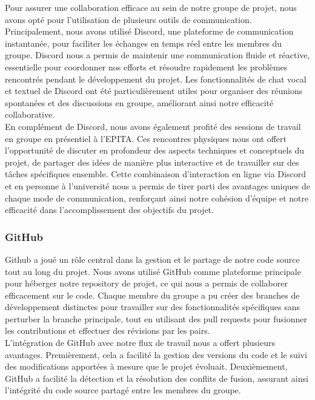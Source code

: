 Pour assurer une collaboration efficace au sein de notre groupe de projet, nous avons opté pour l'utilisation de plusieurs outils de communication. 
Principalement, nous avons utilisé Discord, une plateforme de communication instantanée, pour faciliter les échanges en temps réel entre les membres du groupe. 
Discord nous a permis de maintenir une communication fluide et réactive, essentielle pour coordonner nos efforts et résoudre rapidement les problèmes rencontrés pendant le développement du projet. 
Les fonctionnalités de chat vocal et textuel de Discord ont été particulièrement utiles pour organiser des réunions spontanées et des discussions en groupe, améliorant ainsi notre efficacité collaborative.
\\

En complément de Discord, nous avons également profité des sessions de travail en groupe en présentiel à l'EPITA. Ces rencontres physiques nous ont offert l'opportunité de discuter en profondeur des aspects techniques et conceptuels du projet, de partager des idées de manière plus interactive et de travailler sur des tâches spécifiques ensemble. Cette combinaison d'interaction en ligne via Discord et en personne à l'université nous a permis de tirer parti des avantages uniques de chaque mode de communication,
renforçant ainsi notre cohésion d'équipe et notre efficacité dans l'accomplissement des objectifs du projet.
\\



\subsubsection{GitHub}

Github a joué un rôle central dans la gestion et le partage de notre code source tout au long du projet.
Nous avons utilisé GitHub comme plateforme principale pour héberger notre repository de projet, ce qui nous a permis de collaborer efficacement sur le code.
Chaque membre du groupe a pu créer des branches de développement distinctes pour travailler sur des fonctionnalités spécifiques sans perturber la branche principale, tout en utilisant des pull requests pour fusionner les contributions et effectuer des révisions par les pairs.
\\

L'intégration de GitHub avec notre flux de travail nous a offert plusieurs avantages.
Premièrement, cela a facilité la gestion des versions du code et le suivi des modifications apportées à mesure que le projet évoluait.
Deuxièmement, GitHub a facilité la détection et la résolution des conflits de fusion, assurant ainsi l'intégrité du code source partagé entre les membres du groupe.
\\
